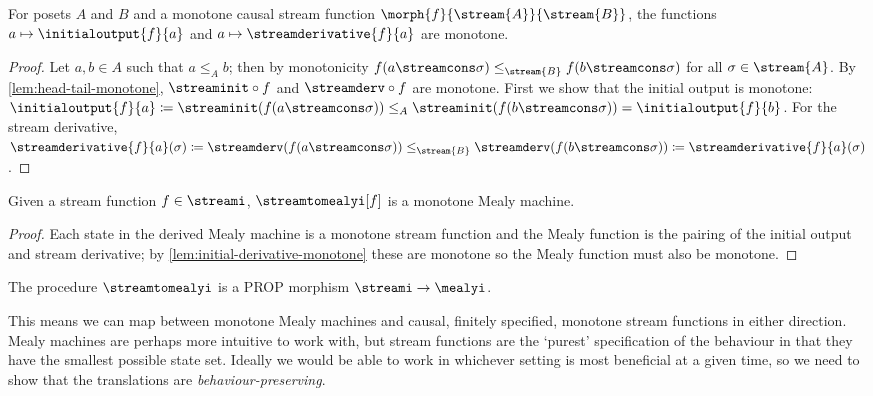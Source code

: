 \begin{lemma}\label{lem:initial-derivative-monotone}
    For posets \(A\) and \(B\) and a monotone causal stream function
    \(\morph{f}{\stream{A}}{\stream{B}}\), the functions
    \(a \mapsto \initialoutput{f}{a}\) and \(a \mapsto \streamderivative{f}{a}\)
    are monotone.
\end{lemma}
\begin{proof}
    Let \(a, b \in A\) such that \(a \leq_A b\); then by monotonicity
    \(f(a \streamcons \sigma) \leq_{\stream{B}} f(b \streamcons \sigma)\) for
    all \(\sigma \in \stream{A}\).
    By \cref{lem:head-tail-monotone}, \(\streaminit \circ f\) and
    \(\streamderv \circ f\) are monotone.
    First we show that the initial output is monotone: \(
    \initialoutput{f}{a} \coloneqq
    \streaminit(f(a \streamcons \sigma)) \leq_{A}
    \streaminit(f(b \streamcons \sigma)) =
    \initialoutput{f}{b}
    \).
    For the stream derivative, \(
    \streamderivative{f}{a}(\sigma) \coloneqq
    \streamderv(f(a \streamcons \sigma)) \leq_{\stream{B}}
    \streamderv(f(b \streamcons \sigma)) \coloneqq
    \streamderivative{f}{a}(\sigma)
    \).
\end{proof}

\begin{lemma}\label{lem:stream-to-mealy-is-monotone}
    Given a stream function \(f \in \streami\), \(\streamtomealyi[f]\) is
    a monotone Mealy machine.
\end{lemma}
\begin{proof}
    Each state in the derived Mealy machine is a monotone stream function and
    the Mealy function is the pairing of the initial output and stream
    derivative; by \cref{lem:initial-derivative-monotone} these are monotone so
    the Mealy function must also be monotone.
\end{proof}

\begin{corollary}
    The procedure \(\streamtomealyi\) is a PROP morphism
    \(\streami \to \mealyi\).
\end{corollary}

This means we can map between monotone Mealy machines and causal, finitely
specified, monotone stream functions in either direction.
Mealy machines are perhaps more intuitive to work with, but stream functions
are the `purest' specification of the behaviour in that they have the smallest
possible state set.
Ideally we would be able to work in whichever setting is most beneficial at a
given time, so we need to show that the translations are
\emph{behaviour-preserving}.


